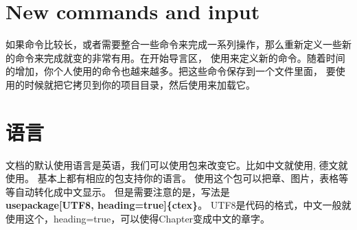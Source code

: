 
\section{New commands and input}

如果命令比较长，或者需要整合一些命令来完成一系列操作，那么重新定义一些新的命令来完成就变的非常有用。在开始导言区， 
使用来定义新的命令。随着时间的增加，你个人使用的命令也越来越多。把这些命令保存到一个文件里面，
要使用的时候就把它拷贝到你的项目目录，然后使用来加载它。


\section{语言}

文档的默认使用语言是英语，我们可以使用包来改变它。比如中文就使用, 德文就使用。
基本上都有相应的包支持你的语言。
使用这个包可以把章、图片，表格等等自动转化成中文显示。
但是需要注意的是，写法是\textbf{\\usepackage[UTF8, heading=true]\{ctex\}}。
UTF8是代码的格式，中文一般就使用这个，heading=true，可以使得Chapter变成中文的章字。

